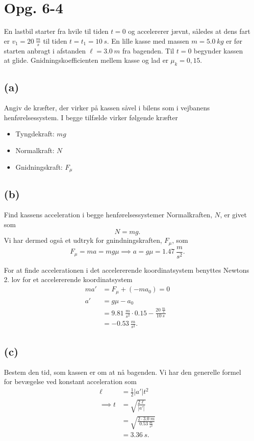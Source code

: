 \documentclass[12pt]{article}
\theoremstyle{definition}
\begin{document}
\section*{Opg. 6-4}
En lastbil starter fra hvile til tiden $t = 0$ og accelererer jævnt, således at dens fart er $v_1 = \qty{20}{\frac{m}{s}}$ til tiden $t = t_1 = \qty{10}{s}$. En lille kasse med massen $m = \qty{5,0}{kg}$ er før starten anbragt i afstanden $\ell = \qty{3,0}{m}$ fra bagenden. Til $t = 0$ begynder kassen at glide. Gnidningskoefficienten mellem kasse og lad er $\mu_k = 0,15$.

\subsection*{(a)}
Angiv de kræfter, der virker på kassen såvel i bilens som i vejbanens henførelsessystem.
\bigbreak
I begge tilfælde virker følgende kræfter
\begin{itemize}
  \item Tyngdekraft: $mg$ 
  \item Normalkraft: $N$
  \item Gnidningskraft: $F_{\mu}$
\end{itemize}

\subsection*{(b)}
Find kassens acceleration i begge henførelsessystemer
\bigbreak
Normalkraften, $N$, er givet som
\[ 
N = mg
.\]
Vi har dermed også et udtryk for gnindningskraften, $F_{\mu}$, som
\[ 
F_{\mu} = ma = mg\mu \implies a = g\mu = \qty{1,47}{\frac{m}{s^2}} 
.\]

For at finde accelerationen i det accelererende koordinatsystem benyttes Newtons 2. lov for et accelererende koordinatsystem
\begin{align*}
  ma' &= F_{\mu} + (-ma_0) = 0 \\
  a' &= g\mu - a_0 \\
     &= \qty{9,81}{\frac{m}{s^2}} \cdot \num{0,15} - \frac{\qty{20}{\frac{m}{s}}}{\qty{10}{s}}  \\
     &= \qty{-0,53}{\frac{m}{s^2}}
.\end{align*}


\subsection*{(c)}
Bestem den tid, som kassen er om at nå bagenden.
\bigbreak
Vi har den generelle formel for bevægelse ved konstant acceleration som
\begin{align*}
  \ell &= \frac{1}{2} |a'|t^2 \\
  \implies t &= \sqrt{\frac{2 \ell}{|a'|}} \\
  &= \sqrt{\frac{2\cdot \qty{3,0}{m}}{\qty{0,53}{\frac{m}{s^2}}}} \\
  &= \qty{3,36}{s}
.\end{align*}
\end{document}
